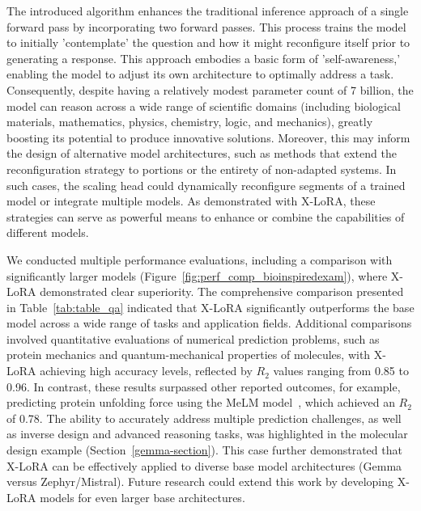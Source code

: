 The introduced algorithm enhances the traditional inference approach of a single forward pass by incorporating two forward passes. This process trains the model to initially 'contemplate' the question and how it might reconfigure itself prior to generating a response. This approach embodies a basic form of 'self-awareness,' enabling the model to adjust its own architecture to optimally address a task. Consequently, despite having a relatively modest parameter count of 7 billion, the model can reason across a wide range of scientific domains (including biological materials, mathematics, physics, chemistry, logic, and mechanics), greatly boosting its potential to produce innovative solutions. Moreover, this may inform the design of alternative model architectures, such as methods that extend the reconfiguration strategy to portions or the entirety of non-adapted systems. In such cases, the scaling head could dynamically reconfigure segments of a trained model or integrate multiple models. As demonstrated with X-LoRA, these strategies can serve as powerful means to enhance or combine the capabilities of different models.

We conducted multiple performance evaluations, including a comparison with significantly larger models (Figure~\ref{fig:perf_comp_bioinspiredexam}), where X-LoRA demonstrated clear superiority. The comprehensive comparison presented in Table~\ref{tab:table_qa} indicated that X-LoRA significantly outperforms the base model across a wide range of tasks and application fields. Additional comparisons involved quantitative evaluations of numerical prediction problems, such as protein mechanics and quantum-mechanical properties of molecules, with X-LoRA achieving high accuracy levels, reflected by $R_2$ values ranging from 0.85 to 0.96. In contrast, these results surpassed other reported outcomes, for example, predicting protein unfolding force using the MeLM model~\cite{Buehler2023MeLMProblemsb}, which achieved an $R_2$ of 0.78. The ability to accurately address multiple prediction challenges, as well as inverse design and advanced reasoning tasks, was highlighted in the molecular design example (Section~\ref{gemma-section}). This case further demonstrated that X-LoRA can be effectively applied to diverse base model architectures (Gemma versus Zephyr/Mistral). Future research could extend this work by developing X-LoRA models for even larger base architectures.

